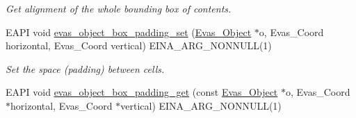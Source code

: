 \begin{DoxyCompactItemize}
\begin{DoxyCompactList}\small\item\em Get alignment of the whole bounding box of contents. \item\end{DoxyCompactList}\item 
EAPI void \hyperlink{group__Evas__Object__Box_ga75ab3d2f84c328010c26a6b8d89c9c67}{evas\_\-object\_\-box\_\-padding\_\-set} (\hyperlink{group__Evas__Object__Group_ga9e19e6dd1f517a0ba437c0114d3e7c97}{Evas\_\-Object} $\ast$o, Evas\_\-Coord horizontal, Evas\_\-Coord vertical) EINA\_\-ARG\_\-NONNULL(1)\label{group__Evas__Object__Box_ga75ab3d2f84c328010c26a6b8d89c9c67}

\begin{DoxyCompactList}\small\item\em Set the space (padding) between cells. \item\end{DoxyCompactList}\item 
EAPI void \hyperlink{group__Evas__Object__Box_gab24383f3b29c8bc78c98cd0b0f16902d}{evas\_\-object\_\-box\_\-padding\_\-get} (const \hyperlink{group__Evas__Object__Group_ga9e19e6dd1f517a0ba437c0114d3e7c97}{Evas\_\-Object} $\ast$o, Evas\_\-Coord $\ast$horizontal, Evas\_\-Coord $\ast$vertical) EINA\_\-ARG\_\-NONNULL(1)\label{group__Evas__Object__Box_gab24383f3b29c8bc78c98cd0b0f16902d}


\end{DoxyCompactItemize}
